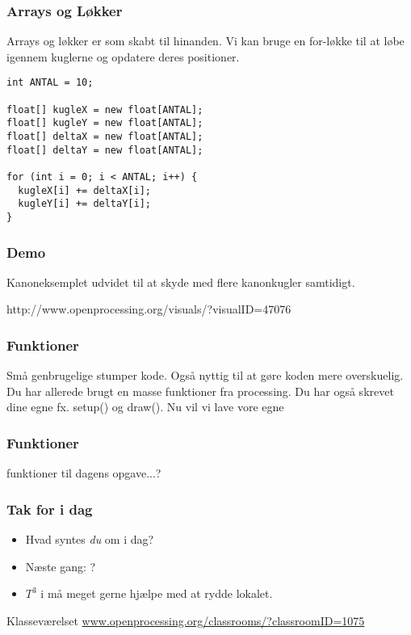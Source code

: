 \documentclass{beamer}
\begin{document}
\begin{frame}[fragile]
  \frametitle{Arrays og Løkker}
  
  Arrays og løkker er som skabt til hinanden. Vi kan bruge en for-løkke til 
  at løbe igennem kuglerne og opdatere deres positioner.

\begin{verbatim}
int ANTAL = 10;

float[] kugleX = new float[ANTAL];
float[] kugleY = new float[ANTAL];
float[] deltaX = new float[ANTAL];
float[] deltaY = new float[ANTAL];

for (int i = 0; i < ANTAL; i++) {
  kugleX[i] += deltaX[i];
  kugleY[i] += deltaY[i];
}
\end{verbatim}
  
   
\end{frame}

\begin{frame}[fragile]
  \frametitle{Demo}
  
  Kanoneksemplet udvidet til at skyde med flere kanonkugler samtidigt.
  
  http://www.openprocessing.org/visuals/?visualID=47076
  
\end{frame}

\begin{frame}[fragile]
  \frametitle{Funktioner}
  
  {\tiny Små genbrugelige stumper kode. Også nyttig til at gøre koden mere overskuelig. Du har allerede brugt en masse funktioner fra processing. Du har også skrevet dine egne fx. setup() og draw(). Nu vil vi lave vore egne}  
\end{frame}

\begin{frame}[fragile]
  \frametitle{Funktioner}
  
  {\tiny funktioner til dagens opgave...?}  
\end{frame}


\begin{frame}
  \frametitle{Tak for i dag}

  \begin{itemize}
  \item Hvad syntes \emph{du} om i dag?
  \item Næste gang: ?
  \item $T^3$ i må meget gerne hjælpe med at rydde lokalet.
  \end{itemize}

  \begin{block}{Klasseværelset}
    \url{www.openprocessing.org/classrooms/?classroomID=1075}
  \end{block}

\end{frame}
\end{document}
